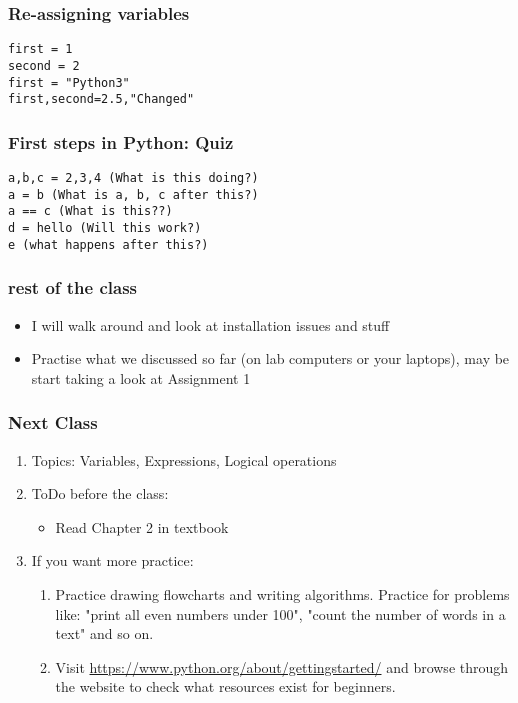 \documentclass{beamer}
\begin{document}
\begin{frame}[fragile]
\frametitle{Re-assigning variables}
\begin{verbatim}
first = 1
second = 2
first = "Python3"
first,second=2.5,"Changed"
\end{verbatim}
\end{frame}

\begin{frame}[fragile]
\frametitle{First steps in Python: Quiz}
\begin{verbatim}
a,b,c = 2,3,4 (What is this doing?)
a = b (What is a, b, c after this?)
a == c (What is this??)
d = hello (Will this work?)
e (what happens after this?)
\end{verbatim}
\end{frame}

\begin{frame}
\frametitle{rest of the class}
\begin{itemize}
\item I will walk around and look at installation issues and stuff
\item Practise what we discussed so far (on lab computers or your laptops), may be start taking a look at Assignment 1 
\end{itemize}
\end{frame}

\begin{frame}%
\frametitle{Next Class}
\begin{enumerate}
\item Topics: Variables, Expressions, Logical operations
\item ToDo before the class:
\begin{itemize}
\item Read Chapter 2 in textbook
\end{itemize}
\item If you want more practice: 
\begin{enumerate}
\item Practice drawing flowcharts and writing algorithms. Practice for problems like: "print all even numbers under 100", "count the number of words in a text" and so on. 
\item Visit \url{https://www.python.org/about/gettingstarted/} and browse through the website to check what resources exist for beginners.
\end{enumerate}
\end{enumerate}
\end{frame}
\end{document}
